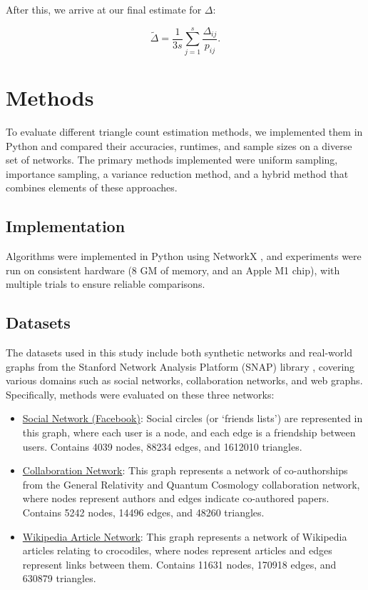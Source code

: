 \documentclass[11pt, margin=1in]{article}
\begin{document}
After this, we arrive at our final estimate for $\Delta$:

\[
\tilde{\Delta} = \frac{1}{3s} \sum_{j = 1}^{s} \frac{\Delta_{ij}}{p_{ij}}.
\]

\newpage

\section{Methods}

To evaluate different triangle count estimation methods, we implemented them in Python and compared their accuracies, runtimes, and sample sizes on a diverse set of networks.
The primary methods implemented were uniform sampling, importance sampling, a variance reduction method, and a hybrid method that combines elements of these approaches. 

\subsection{Implementation}

Algorithms were implemented in Python using NetworkX \cite{hagberg_exploring_2008}, and experiments were run on consistent hardware (8 GM of memory, and an Apple M1 chip), with multiple trials to ensure reliable comparisons.

\subsection{Datasets}

The datasets used in this study include both synthetic networks and real-world graphs from the Stanford Network Analysis Platform (SNAP) library \cite{leskovec_snap_2017}, covering various domains such as social networks, collaboration networks, and web graphs.
Specifically, methods were evaluated on these three networks:

\begin{itemize}
    \item \href{https://snap.stanford.edu/data/ego-Facebook.html}{Social Network (Facebook)}: Social circles (or `friends lists') are represented in this graph, where each user is a node, and each edge is a friendship between users. Contains 4039 nodes, 88234 edges, and 1612010 triangles.
    \item \href{https://snap.stanford.edu/data/ca-GrQc.html}{Collaboration Network}: This graph represents a network of co-authorships from the General Relativity and Quantum Cosmology collaboration network, where nodes represent authors and edges indicate co-authored papers. Contains 5242 nodes, 14496 edges, and 48260 triangles.
    \item \href{https://snap.stanford.edu/data/wikipedia-article-networks.html}{Wikipedia Article Network}: This graph represents a network of Wikipedia articles relating to crocodiles, where nodes represent articles and edges represent links between them. Contains 11631 nodes, 170918 edges, and 630879 triangles.
\end{itemize}
\end{document}
